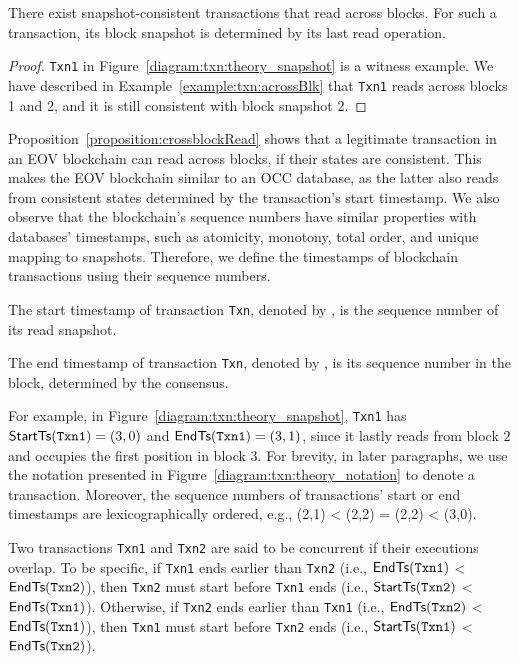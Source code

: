 \begin{proposition}
  \label{proposition:crossblockRead}
  There exist snapshot-consistent transactions that read across blocks. For such
  a transaction, its block snapshot is determined by its last read operation.
\end{proposition}

\begin{proof}
  \texttt{Txn1} in Figure~\ref{diagram:txn:theory_snapshot} is a witness example.
  We have described in Example~\ref{example:txn:acrossBlk} that \texttt{Txn1} reads across
  blocks 1 and 2, and it is still consistent with block snapshot 2.
\end{proof}

Proposition~\ref{proposition:crossblockRead} shows that a legitimate transaction in an
EOV blockchain can read across blocks, if their states are consistent.
%
This makes the EOV blockchain similar to an OCC database, as the
latter also reads from consistent states determined by the transaction's start
timestamp.
%
We also observe that the blockchain's sequence numbers have similar properties with
databases' timestamps, such as atomicity, monotony, total order, and
unique mapping to snapshots.
%
Therefore, we define the timestamps of blockchain transactions using their
sequence numbers.

\begin{definition}
  \label{defn:start-timestamp}
  The start timestamp of transaction \texttt{Txn}, denoted by , is
  the sequence number of its read snapshot.
\end{definition}

\begin{definition}
  \label{defn:commit-timestamp}
  The end timestamp of transaction \texttt{Txn}, denoted by , is its sequence number in the block, determined by the consensus. 
\end{definition}

For example, in Figure~\ref{diagram:txn:theory_snapshot}, \texttt{Txn1} has $\textsf{StartTs}(\texttt{Txn1}) =
(3, 0)$ and $\textsf{EndTs}(\texttt{Txn1}) = (3,1)$, since it lastly reads from block $2$ and
occupies the first position in block $3$.
%
For brevity, in later paragraphs, we use the notation presented in
Figure~\ref{diagram:txn:theory_notation} to denote a transaction.
%
Moreover, the sequence numbers of transactions' start or end timestamps are lexicographically ordered, e.g., (2,1) < (2,2) = (2,2) < (3,0).

\begin{definition}
  \label{defn:concurrent-transaction}
  Two transactions \texttt{Txn1} and \texttt{Txn2} are said to be concurrent if their executions overlap. 
  To be specific, if \texttt{Txn1} ends earlier than \texttt{Txn2} (i.e., $\textsf{EndTs}(\texttt{Txn1})$ < $\textsf{EndTs}(\texttt{Txn2})$), then \texttt{Txn2} must start before \texttt{Txn1} ends (i.e., $\textsf{StartTs}(\texttt{Txn2})$ < $\textsf{EndTs}(\texttt{Txn1})$). Otherwise, if \texttt{Txn2} ends earlier than \texttt{Txn1} (i.e., $\textsf{EndTs}(\texttt{Txn2})$ < $\textsf{EndTs}(\texttt{Txn1})$), then \texttt{Txn1} must start before \texttt{Txn2} ends (i.e., $\textsf{StartTs}(\texttt{Txn1})$ < $\textsf{EndTs}(\texttt{Txn2})$).
\end{definition}

